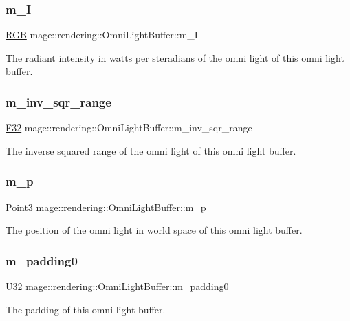 \subsubsection{\texorpdfstring{m\+\_\+I}{m\_I}}
{\footnotesize\ttfamily \mbox{\hyperlink{structmage_1_1_r_g_b}{R\+GB}} mage\+::rendering\+::\+Omni\+Light\+Buffer\+::m\+\_\+I}

The radiant intensity in watts per steradians of the omni light of this omni light buffer. \mbox{\label{structmage_1_1rendering_1_1_omni_light_buffer_ac6a0b6050b8d705d46f72ed115b28c4a}} 
\subsubsection{\texorpdfstring{m\+\_\+inv\+\_\+sqr\+\_\+range}{m\_inv\_sqr\_range}}
{\footnotesize\ttfamily \mbox{\hyperlink{namespacemage_aa97e833b45f06d60a0a9c4fc22ae02c0}{F32}} mage\+::rendering\+::\+Omni\+Light\+Buffer\+::m\+\_\+inv\+\_\+sqr\+\_\+range}

The inverse squared range of the omni light of this omni light buffer. \mbox{\label{structmage_1_1rendering_1_1_omni_light_buffer_aab9cd7c4702a9cba7b47ec49983658d7}} 
\subsubsection{\texorpdfstring{m\+\_\+p}{m\_p}}
{\footnotesize\ttfamily \mbox{\hyperlink{structmage_1_1_point3}{Point3}} mage\+::rendering\+::\+Omni\+Light\+Buffer\+::m\+\_\+p}

The position of the omni light in world space of this omni light buffer. \mbox{\label{structmage_1_1rendering_1_1_omni_light_buffer_a3b440492e1a9fc48c6f109e5787aa4c7}} 
\subsubsection{\texorpdfstring{m\+\_\+padding0}{m\_padding0}}
{\footnotesize\ttfamily \mbox{\hyperlink{namespacemage_a41c104c036fba3756a74e19f793eeaa1}{U32}} mage\+::rendering\+::\+Omni\+Light\+Buffer\+::m\+\_\+padding0}

The padding of this omni light buffer. 